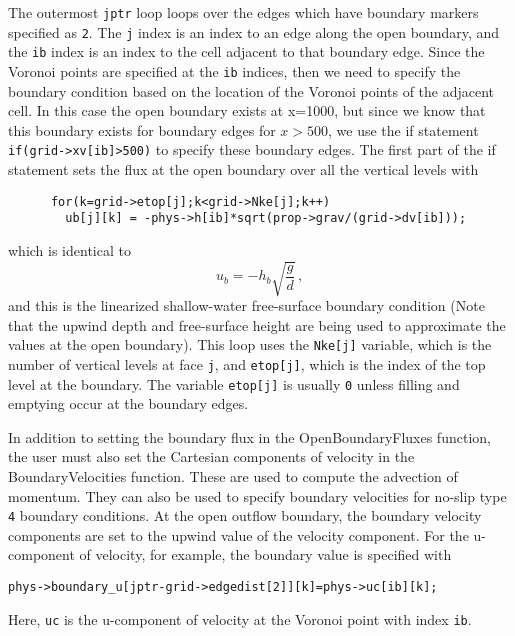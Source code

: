 The outermost \verb+jptr+ loop loops over the edges which have boundary markers specified as \verb+2+.
The \verb+j+ index is an index to an edge along the open boundary, and 
the \verb+ib+ index is an index to the cell adjacent to that boundary edge.  Since the Voronoi points
are specified at the \verb+ib+ indices, then we need to specify the boundary condition based on
the location of the Voronoi points of the adjacent cell.  In this case the open boundary exists at x=1000, but since
we know that this boundary exists for boundary edges for $x>500$, we use the if statement
\verb+if(grid->xv[ib]>500)+ to specify these boundary edges.  The first part of the if statement
sets the flux at the open boundary over all the vertical levels with
\begin{verbatim}
      for(k=grid->etop[j];k<grid->Nke[j];k++) 
        ub[j][k] = -phys->h[ib]*sqrt(prop->grav/(grid->dv[ib]));
\end{verbatim}
which is identical to 
\[ u_b = -h_b\sqrt{\frac{g}{d}} \,,\]
and this is the linearized shallow-water free-surface boundary condition (Note that the upwind depth
and free-surface height are being used to approximate the values at the open boundary).  This loop uses
the \verb+Nke[j]+ variable, which is the number of vertical levels at face \verb+j+,
and \verb+etop[j]+, which is the index of the top level at the boundary.  The variable
\verb+etop[j]+ is usually \verb+0+ unless filling and emptying occur at the boundary
edges.  

In addition to setting
the boundary flux in the OpenBoundaryFluxes function, the user must also set the Cartesian components
of velocity in the BoundaryVelocities function.  These are used to compute the advection of momentum. 
They can also be used to specify boundary velocities for no-slip type \verb+4+ boundary conditions.
At the open outflow boundary, the boundary velocity components are set to the upwind value of the velocity
component.  For the u-component of velocity, for example, the boundary value is specified
with
\begin{verbatim}
phys->boundary_u[jptr-grid->edgedist[2]][k]=phys->uc[ib][k];
\end{verbatim}
Here, \verb+uc+ is the u-component of velocity at the Voronoi point with index \verb+ib+.

